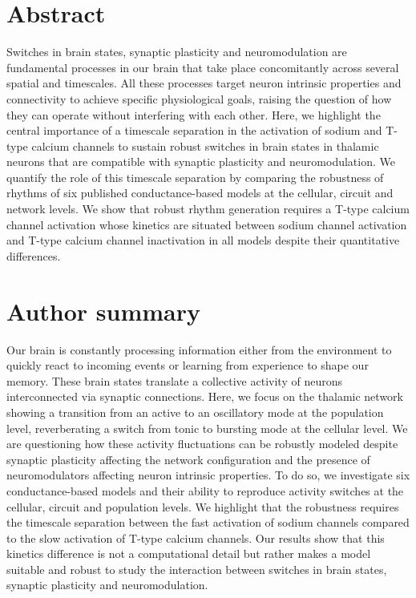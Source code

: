 \section{Abstract}
Switches in brain states, synaptic plasticity and neuromodulation are fundamental processes in our brain that take place concomitantly across several spatial and timescales. All these processes target neuron intrinsic properties and connectivity to achieve specific physiological goals, raising the question of how they can operate without interfering with each other. Here, we highlight the central importance of a timescale separation in the activation of sodium and T-type calcium channels to sustain robust switches in brain states in thalamic neurons that are compatible with synaptic plasticity and neuromodulation. We quantify the role of this timescale separation by comparing the robustness of rhythms of six published conductance-based models at the cellular, circuit and network levels. We show that robust rhythm generation requires a T-type calcium channel activation whose kinetics are situated between sodium channel activation and T-type calcium channel inactivation in all models despite their quantitative differences. 

\section{Author summary}
Our brain is constantly processing information either from the environment to quickly react to incoming events or learning from experience to shape our memory. These brain states translate a collective activity of neurons interconnected via synaptic connections. Here, we focus on the thalamic network showing a transition from an active to an oscillatory mode at the population level, reverberating a switch from tonic to bursting mode at the cellular level. We are questioning how these activity fluctuations can be  robustly modeled despite synaptic plasticity affecting the network configuration and the presence of neuromodulators affecting neuron intrinsic properties. To do so, we investigate six conductance-based models and their ability to reproduce activity switches at the cellular, circuit and population levels.  We highlight that the robustness requires the timescale separation between the fast activation of sodium channels compared to the slow activation of T-type calcium channels. Our results show that this kinetics difference is not a computational detail but rather makes a model suitable and robust to study the interaction between switches in brain states, synaptic plasticity and neuromodulation.

